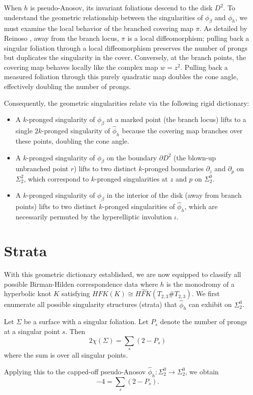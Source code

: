 When $h$ is pseudo-Anosov, its invariant foliations descend to the disk $D^2$. To understand the geometric relationship between the singularities of $\phi_\beta$ and $\phi_h$, we must examine the local behavior of the branched covering map $\pi$. As detailed by Reinoso \cite[Section 2.2]{reinoso2024pseudo}, away from the branch locus, $\pi$ is a local diffeomorphism; pulling back a singular foliation through a local diffeomorphism preserves the number of prongs but duplicates the singularity in the cover. Conversely, at the branch points, the covering map behaves locally like the complex map $w = z^2$. Pulling back a measured foliation through this purely quadratic map doubles the cone angle, effectively doubling the number of prongs.

Consequently, the geometric singularities relate via the following rigid dictionary:
\begin{itemize}
    \item A $k$-pronged singularity of $\phi_\beta$ at a marked point (the branch locus) lifts to a single $2k$-pronged singularity of $\hat{\phi}_h$ because the covering map branches over these points, doubling the cone angle.
    \item A $k$-pronged singularity of $\phi_\beta$ on the boundary $\partial D^2$ (the blown-up unbranched point $r$) lifts to two distinct $k$-pronged boundaries $\partial_z$ and $\partial_p$ on $\Sigma_2^2$, which correspond to $k$-pronged singularities at $z$ and $p$ on $\Sigma_2^0$.
    \item A $k$-pronged singularity of $\phi_\beta$ in the interior of the disk (away from branch points) lifts to two distinct $k$-pronged singularities of $\hat{\phi}_h$, which are necessarily permuted by the hyperelliptic involution $\iota$.
\end{itemize}

\section{Strata}\label{sec:euler_poincare}
With this geometric dictionary established, we are now equipped to classify all possible Birman-Hilden correspondence data where $h$ is the monodromy of a hyperbolic knot $K$ satisfying $\widehat{HFK}(K) \cong \widehat{HFK}(T_{2,3} \# T_{2,3})$. We first enumerate all possible singularity structures (strata) that $\hat{\phi}_h$ can exhibit on $\Sigma_2^0$.

\begin{prop}\label{prop:EulerPoincare}
    Let $\Sigma$ be a surface with a singular foliation. Let $P_s$ denote the number of prongs at a singular point $s$. Then
    \[
    2 \chi(\Sigma) = \sum_s (2 - P_s)
    \]
    where the sum is over all singular points.
\end{prop}
Applying this to the capped-off pseudo-Anosov $\hat{\phi}_h \colon \Sigma_2^0 \to \Sigma_2^0$, we obtain
\begin{equation}\label{equation:euler-poincare}
    -4 = \sum_s (2 - P_s).
\end{equation}

